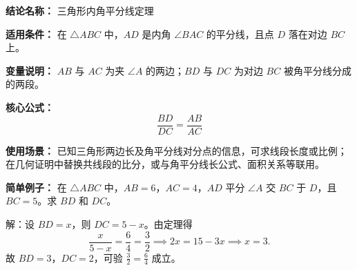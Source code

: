 \textbf{结论名称：} 三角形内角平分线定理

\textbf{适用条件：} 在 $\triangle ABC$ 中，$AD$ 是内角 $\angle BAC$ 的平分线，且点 $D$ 落在对边 $BC$ 上。

\textbf{变量说明：} $AB$ 与 $AC$ 为夹 $\angle A$ 的两边；$BD$ 与 $DC$ 为对边 $BC$ 被角平分线分成的两段。

\textbf{核心公式：} 
\[
\boxed{\frac{BD}{DC} = \frac{AB}{AC}}
\]

\textbf{使用场景：} 
已知三角形两边长及角平分线对分点的信息，可求线段长度或比例；在几何证明中替换共线段的比分，或与角平分线长公式、面积关系等联用。

\textbf{简单例子：} 
在 $\triangle ABC$ 中，$AB=6$，$AC=4$，$AD$ 平分 $\angle A$ 交 $BC$ 于 $D$，且 $BC=5$。求 $BD$ 和 $DC$。

解：设 $BD=x$，则 $DC=5-x$。由定理得
\[
\frac{x}{5-x} = \frac{6}{4} = \frac{3}{2} \implies 2x=15-3x \implies x=3.
\]
故 $BD=3$，$DC=2$，可验 $\frac{3}{2}=\frac{6}{4}$ 成立。